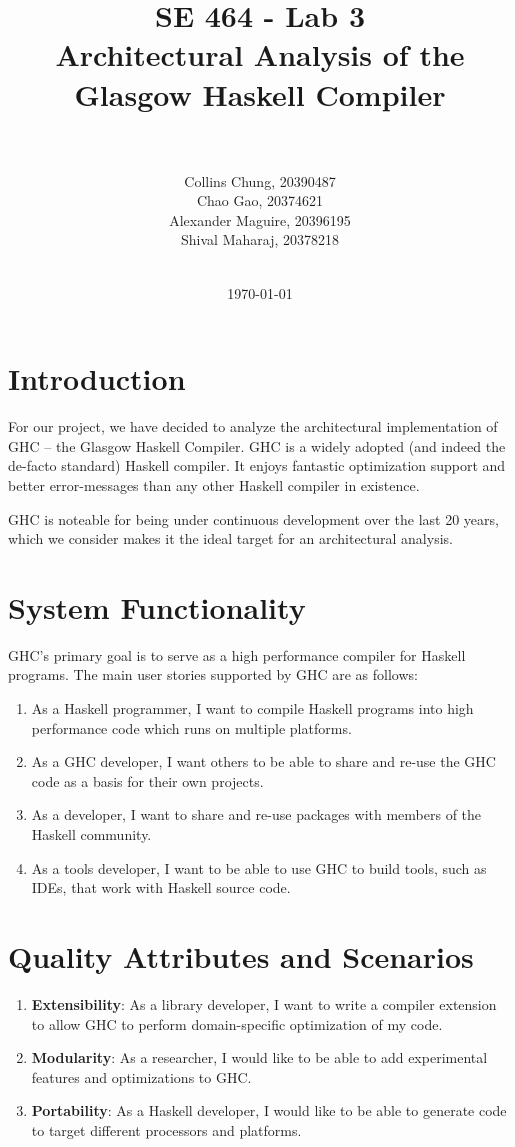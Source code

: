 \documentclass[a4paper]{article}
\title{SE 464 - Lab 3 \\ Architectural Analysis of the Glasgow Haskell Compiler}
\author{
\\
\\
Collins Chung, 20390487 \\
Chao Gao, 20374621\\
Alexander Maguire, 20396195 \\
Shival Maharaj, 20378218
\\
\\
}
\date{\today}
\begin{document}
\maketitle
\newpage


\section{Introduction}

For our project, we have decided to analyze the architectural implementation of GHC -- the Glasgow Haskell Compiler. GHC is a widely adopted (and indeed the de-facto standard) Haskell compiler. It enjoys fantastic optimization support and better error-messages than any other Haskell compiler in existence.

GHC is noteable for being under continuous development over the last 20 years, which we consider makes it the ideal target for an architectural analysis.


\section{System Functionality}
GHC's primary goal is to serve as a high performance compiler for Haskell programs. The main user stories supported by GHC are as follows:
\begin{enumerate}
\item As a Haskell programmer, I want to compile Haskell programs into high performance code which runs on multiple platforms.
\item As a GHC developer, I want others to be able to share and re-use the GHC code as a basis for their own projects.
\item As a developer, I want to share and re-use packages with members of the Haskell community.
\item As a tools developer, I want to be able to use GHC to build tools, such as IDEs, that work with Haskell source code.
\end{enumerate}


\section{Quality Attributes and Scenarios}

\begin{enumerate}
\item \textbf{Extensibility}: As a library developer, I want to write a compiler extension to allow GHC to perform domain-specific optimization of my code.
\item \textbf{Modularity}: As a researcher, I would like to be able to add experimental features and optimizations to GHC.
\item \textbf{Portability}: As a Haskell developer, I would like to be able to generate code to target different processors and platforms.
\end{enumerate}
\end{document}

